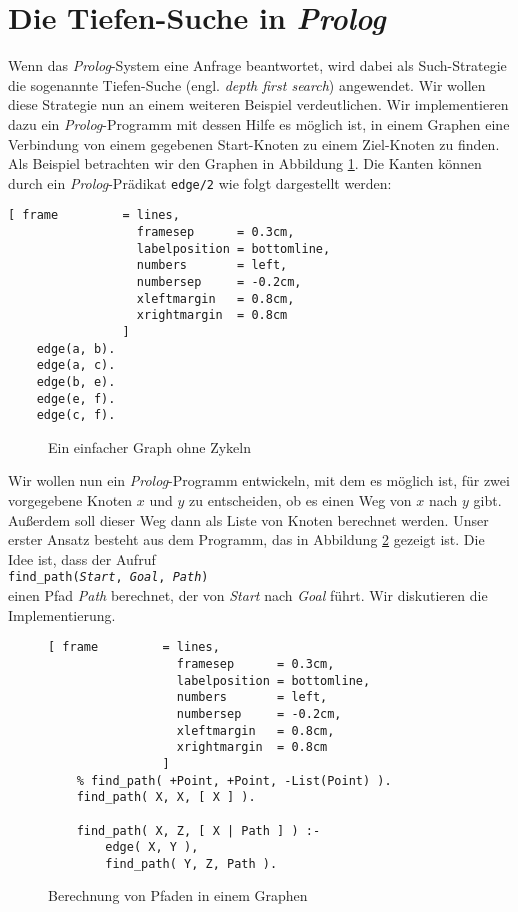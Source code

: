 \section{Die Tiefen-Suche in \textsl{Prolog}}
Wenn das \textsl{Prolog}-System eine Anfrage beantwortet, wird dabei als Such-Strategie
die sogenannte Tiefen-Suche (engl. \emph{depth first search}) angewendet.  Wir wollen
diese Strategie nun an einem weiteren Beispiel verdeutlichen.  Wir implementieren dazu ein
\textsl{Prolog}-Programm  
mit dessen Hilfe es m\"{o}glich ist, in einem Graphen eine Verbindung von einem gegebenen
Start-Knoten zu einem Ziel-Knoten zu finden.  Als Beispiel betrachten wir den Graphen in
Abbildung \ref{fig:graph}.  Die Kanten k\"{o}nnen durch ein \textsl{Prolog}-Pr\"{a}dikat \texttt{edge/2}
wie folgt dargestellt werden:

\begin{Verbatim}[ frame         = lines, 
                  framesep      = 0.3cm, 
                  labelposition = bottomline,
                  numbers       = left,
                  numbersep     = -0.2cm,
                  xleftmargin   = 0.8cm,
                  xrightmargin  = 0.8cm
                ]
    edge(a, b).
    edge(a, c).
    edge(b, e).
    edge(e, f).
    edge(c, f).
\end{Verbatim}

\begin{figure}[!h]
  \centering
  \caption{Ein einfacher Graph ohne Zykeln}
  \label{fig:graph}
\end{figure}

Wir wollen nun ein \textsl{Prolog}-Programm entwickeln, mit dem es m\"{o}glich ist, f\"{u}r zwei
vorgegebene Knoten $x$ und $y$ zu entscheiden, ob es einen Weg von $x$ nach $y$ gibt.
Außerdem soll dieser Weg dann als Liste von Knoten berechnet werden.
Unser erster Ansatz besteht aus dem Programm, das in Abbildung \ref{fig:connect} gezeigt
ist.  Die Idee ist, dass der Aufruf \\[0.1cm]
\hspace*{1.3cm} \texttt{find\_path(\textsl{Start}, \textsl{Goal}, \textsl{Path})} \\[0.1cm]
einen Pfad \textsl{Path} berechnet, der von \textsl{Start} nach \textsl{Goal} f\"{u}hrt.  Wir diskutieren
die Implementierung.

\begin{figure}[!h]
  \centering
\begin{Verbatim}[ frame         = lines, 
                  framesep      = 0.3cm, 
                  labelposition = bottomline,
                  numbers       = left,
                  numbersep     = -0.2cm,
                  xleftmargin   = 0.8cm,
                  xrightmargin  = 0.8cm
                ]
    % find_path( +Point, +Point, -List(Point) ).
    find_path( X, X, [ X ] ).
    
    find_path( X, Z, [ X | Path ] ) :-
        edge( X, Y ),
        find_path( Y, Z, Path ).
\end{Verbatim}
\vspace*{-0.3cm}
  \caption{Berechnung von Pfaden in einem Graphen}
  \label{fig:connect}
\end{figure}

